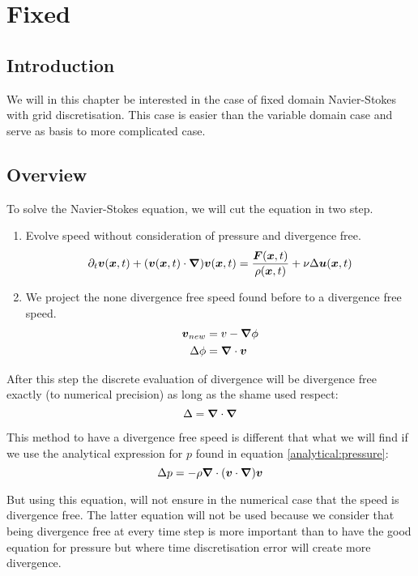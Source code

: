 \chapter{Fixed}
\minitoc
\section{Introduction}

We will in this chapter be interested in the case of fixed domain Navier-Stokes with grid discretisation.
This case is easier than the variable domain case and serve as basis to more complicated case.

\section{Overview}

To solve the Navier-Stokes equation, we will cut the equation in two step.
\begin{enumerate}
 \item Evolve speed without consideration of pressure and divergence free.
  \begin{equation}
   \partial_t {\boldsymbol {v}}({\boldsymbol {x}} ,t)+({\boldsymbol {v}}({\boldsymbol {x}},t)\cdot{\boldsymbol {\nabla}} ) {\boldsymbol {v}}({\boldsymbol {x}} ,t)=\frac{{\boldsymbol {F}}({\boldsymbol {x}},t)}{\rho({\boldsymbol {x}},t)}+\nu \Delta {\boldsymbol {u}}({\boldsymbol {x}},t)
  \end{equation}
 \item We project the none divergence free speed found before to a divergence free speed.
  \begin{align}
   {\boldsymbol {v}}_{new}&=v-{\boldsymbol {\nabla}}\phi\\
   \Delta \phi&={\boldsymbol {\nabla}} \cdot {\boldsymbol {v}}
  \end{align}
\end{enumerate}

After this step the discrete evaluation of divergence will be divergence free exactly (to numerical precision) as long as the shame used respect:
\begin{equation}
 \Delta={\boldsymbol {\nabla}}\cdot {\boldsymbol {\nabla}}
\end{equation}

\begin{rem}
 This method to have a divergence free speed is different that what we will find if we use the analytical expression for $p$ found in equation \ref{analytical:pressure}:
 \begin{equation}
  \Delta p=-\rho {\boldsymbol {\nabla}} \cdot ({\boldsymbol {v}}\cdot {\boldsymbol {\nabla}}) {\boldsymbol {v}}
 \end{equation}
 
 But using this equation, will not ensure in the numerical case that the speed is divergence free.
 The latter equation will not be used because we consider that being divergence free at every time step is more important than
 to have the good equation for pressure but where time discretisation error will create more divergence.
\end{rem}

